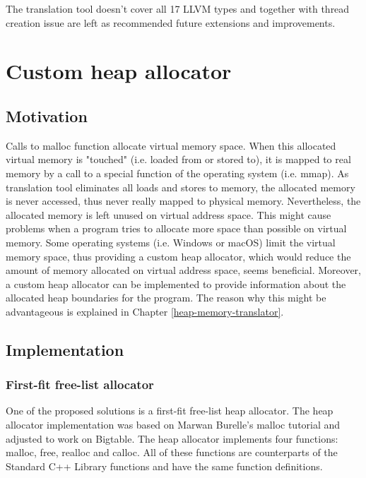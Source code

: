 \documentclass[bsc,frontabs,twoside,singlespacing,parskip,deptreport]{infthesis}     %
\begin{document}
The translation tool doesn't cover all 17 LLVM types and together with thread creation issue are left as recommended future extensions and improvements.

\chapter{Custom heap allocator}

\section{Motivation}

Calls to malloc function allocate virtual memory space. When this allocated virtual memory is "touched" (i.e. loaded from or stored to), it is mapped to real memory by a call to a special function of the operating system (i.e. mmap). As translation tool eliminates all loads and stores to memory, the allocated memory is never accessed, thus never really mapped to physical memory. Nevertheless, the allocated memory is left unused on virtual address space. This might cause problems when a program tries to allocate more space than possible on virtual memory. Some operating systems (i.e. Windows or macOS) limit the virtual memory space, thus providing a custom heap allocator, which would reduce the amount of memory allocated on virtual address space, seems beneficial. Moreover, a custom heap allocator can be implemented to provide information about the allocated heap boundaries for the program. The reason why this might be advantageous is explained in Chapter \ref{heap-memory-translator}. 

\section{Implementation}

\subsection{First-fit free-list allocator}

One of the proposed solutions is a first-fit free-list heap allocator. The heap allocator implementation was based on Marwan Burelle's malloc tutorial \citep{malloc_tutorial} and adjusted to work on Bigtable. The heap allocator implements four functions: malloc, free, realloc and calloc. All of these functions are counterparts of the Standard C++ Library functions and have the same function definitions.
\end{document}
